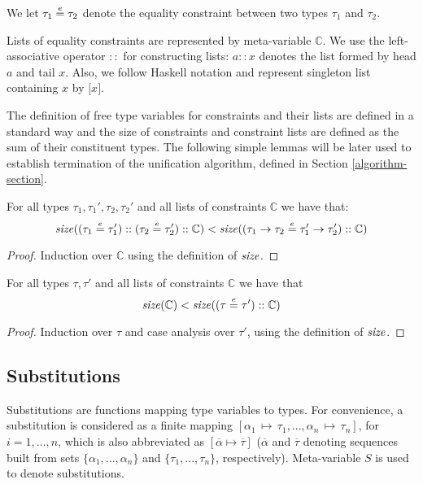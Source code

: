 We let $\tau_1 \overset{e}{=} \tau_2$ denote the equality constraint between two
types $\tau_1$ and $\tau_2$.

Lists of equality constraints are represented by meta-variable
$\mathbb{C}$. We use the left-associative operator $::$ for
constructing lists: $a::x$ denotes the list formed by head $a$ and
tail $x$. Also, we follow Haskell notation and represent singleton list containing
$x$ by $\lbrack x \rbrack$.

The definition of free type variables for constraints and their lists
are defined in a standard way and the size of constraints and
constraint lists are defined as the sum of their constituent
types. The following simple lemmas will be later used to establish
termination of the unification algorithm, defined in Section
\ref{algorithm-section}.

\begin{Lemma}\label{appsize}
For all types $\tau_1,\tau_1', \tau_2,\tau_2'$ and all lists of constraints
$\mathbb{C}$ we have that: \[\text{\it size\/}( (\tau_1\overset{e}{=} \tau_1') :: (\tau_2\overset{e}{=} \tau_2') :: \mathbb{C})
                           < \text{\it size\/}( (\tau_1\to\tau_2 \overset{e}{=} \tau_1'\to\tau_2') :: \mathbb{C})\]
\end{Lemma}
\begin{proof}
Induction over $\mathbb{C}$ using the definition of $\text{\it size\/}$.
\end{proof}

\begin{Lemma}\label{lengthsize}
For all types $\tau,\tau'$ and all lists of constraints $\mathbb{C}$
we have that
\[\text{\it size\/}(\mathbb{C}) < \text{\it size\/}( (\tau\overset{e}{=}\tau') :: \mathbb{C})\]
\end{Lemma}
\begin{proof}
Induction over $\tau$ and case analysis over $\tau'$, using the
definition of $\text{\it size\/}$.
\end{proof}

\subsection{Substitutions}\label{substitution}

Substitutions are functions mapping type variables to types. For
convenience, a substitution is considered as a finite mapping
$[\alpha_1\,\mapsto\,\tau_1,...,\alpha_n\,\mapsto\,\tau_n]$, for
$i=1,\ldots,n$,
which is also abbreviated
as $[\overline{\alpha}\mapsto\overline{\tau}]$ ($\overline{\alpha}$
and $\overline{\tau}$ denoting sequences built from sets
$\{\alpha_1,...,\alpha_n\}$ and $\{\tau_1,...,\tau_n\}$,
respectively). Meta-variable $S$ is used to denote substitutions.

